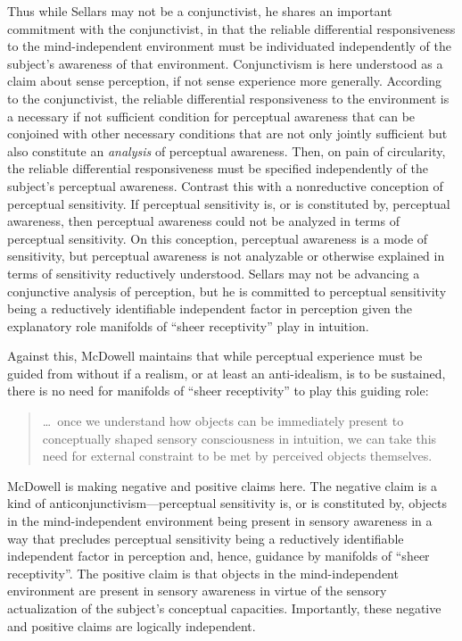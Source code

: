 \documentclass[12pt]{article}
\begin{document}
Thus while Sellars may not be a conjunctivist, he shares an important commitment with the conjunctivist, in that the reliable differential responsiveness to the mind-independent environment must be individuated independently of the subject's awareness of that environment. Conjunctivism is here understood as a claim about sense perception, if not sense experience more generally. According to the conjunctivist, the reliable differential responsiveness to the environment is a necessary if not sufficient condition for perceptual awareness that can be conjoined with other necessary conditions that are not only jointly sufficient but also constitute an \emph{analysis} of perceptual awareness. Then, on pain of circularity, the reliable differential responsiveness must be specified independently of the subject's perceptual awareness. Contrast this with a nonreductive conception of perceptual sensitivity. If perceptual sensitivity is, or is constituted by, perceptual awareness, then perceptual awareness could not be analyzed in terms of perceptual sensitivity. On this conception, perceptual awareness is a mode of sensitivity, but perceptual awareness is not analyzable or otherwise explained in terms of sensitivity reductively understood. Sellars may not be advancing a conjunctive analysis of perception, but he is committed to perceptual sensitivity being a reductively identifiable independent factor in perception given the explanatory role manifolds of ``sheer receptivity'' play in intuition. 

Against this, McDowell maintains that while perceptual experience must be guided from without if a realism, or at least an anti-idealism, is to be sustained, there is no need for manifolds of ``sheer receptivity'' to play this guiding role:
\begin{quote}
    \ldots\ once we understand how objects can be immediately present to conceptually shaped sensory consciousness in intuition, we can take this need for external constraint to be met by perceived objects themselves. \citep[46]{McDowell:1998vn}
\end{quote}
McDowell is making negative and positive claims here. The negative claim is a kind of anticonjunctivism---perceptual sensitivity is, or is constituted by, objects in the mind-independent environment being present in sensory awareness in a way that precludes perceptual sensitivity being a reductively identifiable independent factor in perception and, hence, guidance by manifolds of ``sheer receptivity''. The positive claim is that objects in the mind-independent environment are present in sensory awareness in virtue of the sensory actualization of the subject's conceptual capacities. Importantly, these negative and positive claims are logically independent.
\end{document}
